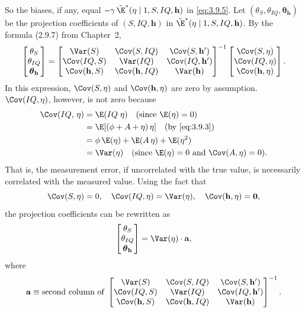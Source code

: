 So the biases, if any, equal
$-\gamma\, \tilde{\E}^*(\eta \mid 1, S, IQ, \mathbf{h})$ in \eqref{eq:3.9.5}.
Let $(\theta_S, \theta_{IQ}, \boldsymbol{\theta}_{\mathbf{h}})$ be the projection coefficients of
$(S, IQ, \mathbf{h})$ in $\tilde{\E}^*(\eta \mid 1, S, IQ, \mathbf{h})$.  By the formula
(2.9.7) from Chapter~2,
\begin{equation}
  \begin{bmatrix} \theta_S \\ \theta_{IQ} \\ \boldsymbol{\theta}_{\mathbf{h}} \end{bmatrix}
  = \begin{bmatrix}
      \Var(S) & \Cov(S, IQ) & \Cov(S, \mathbf{h}') \\
      \Cov(IQ, S) & \Var(IQ) & \Cov(IQ, \mathbf{h}') \\
      \Cov(\mathbf{h}, S) & \Cov(\mathbf{h}, IQ) & \Var(\mathbf{h})
    \end{bmatrix}^{-1}
  \begin{bmatrix} \Cov(S, \eta) \\ \Cov(IQ, \eta) \\ \Cov(\mathbf{h}, \eta)
  \end{bmatrix}.
  \label{eq:3.9.6}
\end{equation}
In this expression, $\Cov(S, \eta)$ and $\Cov(\mathbf{h}, \eta)$ are zero by assumption.
$\Cov(IQ, \eta)$, however, is not zero because
\begin{align*}
  \Cov(IQ,\, \eta) &= \E(IQ\;\eta) \quad \text{(since $\E(\eta) = 0$)} \\
  &= \E[(\phi + A + \eta)\,\eta] \quad \text{(by \eqref{eq:3.9.3})} \\
  &= \phi\,\E(\eta) + \E(A\,\eta) + \E(\eta^2) \\
  &= \Var(\eta) \quad \text{(since $\E(\eta) = 0$ and $\Cov(A,\eta) = 0$)}.
\end{align*}
That is, the measurement error, if uncorrelated with the true value, is necessarily
correlated with the measured value.  Using the fact that
\[
  \Cov(S, \eta) = 0, \quad \Cov(IQ, \eta) = \Var(\eta), \quad
  \Cov(\mathbf{h}, \eta) = \mathbf{0},
\]
the projection coefficients can be rewritten as
\[
  \begin{bmatrix} \theta_S \\ \theta_{IQ} \\ \boldsymbol{\theta}_{\mathbf{h}} \end{bmatrix}
  = \Var(\eta) \cdot \mathbf{a},
\]
where
\[
  \mathbf{a} \equiv \text{second column of }
  \begin{bmatrix}
    \Var(S) & \Cov(S, IQ) & \Cov(S, \mathbf{h}') \\
    \Cov(IQ, S) & \Var(IQ) & \Cov(IQ, \mathbf{h}') \\
    \Cov(\mathbf{h}, S) & \Cov(\mathbf{h}, IQ) & \Var(\mathbf{h})
  \end{bmatrix}^{-1}.
\]

